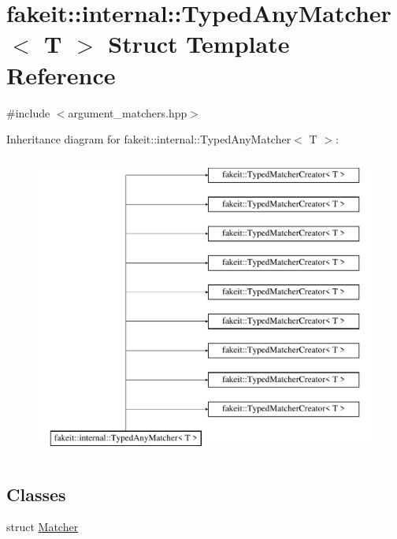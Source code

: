 \hypertarget{structfakeit_1_1internal_1_1TypedAnyMatcher}{}\section{fakeit\+::internal\+::Typed\+Any\+Matcher$<$ T $>$ Struct Template Reference}
\label{structfakeit_1_1internal_1_1TypedAnyMatcher}


{\ttfamily \#include $<$argument\+\_\+matchers.\+hpp$>$}

Inheritance diagram for fakeit\+::internal\+::Typed\+Any\+Matcher$<$ T $>$\+:\begin{figure}[H]
\begin{center}
\leavevmode
\includegraphics[height=10.000000cm]{structfakeit_1_1internal_1_1TypedAnyMatcher}
\end{center}
\end{figure}
\subsection*{Classes}
\begin{DoxyCompactItemize}
\item 
struct \mbox{\hyperlink{structfakeit_1_1internal_1_1TypedAnyMatcher_1_1Matcher}{Matcher}}
\end{DoxyCompactItemize}
